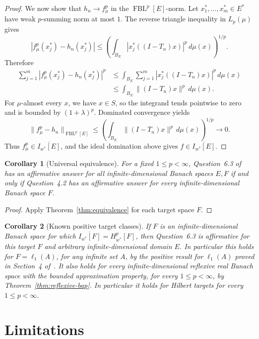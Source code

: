 \documentclass[11pt]{article}
\newtheorem{corollary}{Corollary}
\newcommand{\FBL}{\operatorname{FBL}}
\newcommand{\Iw}{I_{w^*}}
\begin{document}
\begin{proof}
We now show that \(h_n\to f_\mu^p\) in the \(\FBL^p[E]\)-norm.  Let
\(x_1^*,\ldots,x_m^*\in E^*\) have weak \(p\)-summing norm at most \(1\).  The reverse triangle
inequality in \(L_p(\mu)\) gives
\[
  |f_\mu^p(x_j^*)-h_n(x_j^*)|
  \leq \left(\int_{B_E}|x_j^*((I-T_n)x)|^p\,d\mu(x)\right)^{1/p}.
\]
Therefore
\[
\begin{aligned}
  \sum_{j=1}^m |f_\mu^p(x_j^*)-h_n(x_j^*)|^p
  &\leq \int_{B_E}\sum_{j=1}^m |x_j^*((I-T_n)x)|^p\,d\mu(x)\\
  &\leq \int_{B_E}\|(I-T_n)x\|^p\,d\mu(x).
\end{aligned}
\]
For \(\mu\)-almost every \(x\), we have \(x\in S\), so the integrand tends pointwise to zero and is
bounded by \((1+\lambda)^p\).  Dominated convergence yields
\[
  \|f_\mu^p-h_n\|_{\FBL^p[E]}
  \leq
  \left(\int_{B_E}\|(I-T_n)x\|^p\,d\mu(x)\right)^{1/p}
  \longrightarrow0.
\]
Thus \(f_\mu^p\in\overline{I_{w^*}[E]}\), and the ideal domination above gives
\(f\in\overline{I_{w^*}[E]}\).
\end{proof}

\begin{corollary}[Universal equivalence]
For a fixed \(1\leq p<\infty\), Question~6.3 of~\cite{LT} has an affirmative answer for all
infinite-dimensional Banach spaces \(E,F\) if and only if Question~4.2 has an affirmative answer for
every infinite-dimensional Banach space \(F\).
\end{corollary}

\begin{proof}
Apply Theorem~\ref{thm:equivalence} for each target space \(F\).
\end{proof}

\begin{corollary}[Known positive target classes]
If \(F\) is an infinite-dimensional Banach space for which
\(\overline{\Iw[F]}=H_{w^*}^p[F]\), then Question~6.3 is affirmative for this target \(F\) and
arbitrary infinite-dimensional domain \(E\).  In particular this holds for \(F=\ell_1(A)\), for any
infinite set \(A\), by the positive result for \(\ell_1(A)\) proved in Section~4 of~\cite{LT}.  It
also holds for every infinite-dimensional reflexive real Banach space with the bounded approximation
property, for every \(1\leq p<\infty\), by Theorem~\ref{thm:reflexive-bap}.  In particular it holds
for Hilbert targets for every \(1\leq p<\infty\).
\end{corollary}

\section*{Limitations}
\end{document}
